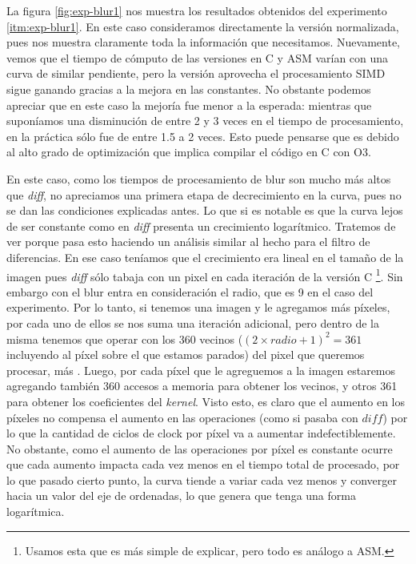 La figura \ref{fig:exp-blur1} nos muestra los resultados obtenidos del experimento \ref{itm:exp-blur1}. En este caso consideramos directamente la versión normalizada, pues nos muestra claramente toda la información que necesitamos. Nuevamente, vemos que el tiempo de cómputo de las versiones en C y ASM varían con una curva de similar pendiente, pero la versión aprovecha el procesamiento SIMD sigue ganando gracias a la mejora en las constantes. No obstante podemos apreciar que en este caso la mejoría fue menor a la esperada: mientras que suponíamos una disminución de entre 2 y 3 veces en el tiempo de procesamiento, en la práctica sólo fue de entre 1.5 a 2 veces. Esto puede pensarse que es debido al alto grado de optimización que implica compilar el código en C con O3.

En este caso, como los tiempos de procesamiento de blur son mucho más altos que \emph{diff}, no apreciamos una primera etapa de decrecimiento en la curva, pues no se dan las condiciones explicadas antes. Lo que si es notable es que la curva lejos de ser constante como en \emph{diff} presenta un crecimiento logarítmico. Tratemos de ver porque pasa esto haciendo un análisis similar al hecho para el filtro de diferencias. En ese caso teníamos que el crecimiento era lineal en el tamaño de la imagen pues \emph{diff} sólo tabaja con un pixel en cada iteración de la versión C \footnote{Usamos esta que es más simple de explicar, pero todo es análogo a ASM.}. Sin embargo con el blur entra en consideración el radio, que es 9 en el caso del experimento. Por lo tanto, si tenemos una imagen y le agregamos más píxeles, por cada uno de ellos se nos suma una iteración adicional, pero dentro de la misma tenemos que operar con los 360 vecinos ($(2\times radio + 1)^2= 361$ incluyendo al píxel sobre el que estamos parados) del pixel que queremos procesar, más . Luego, por cada píxel que le agreguemos a la imagen estaremos agregando también 360 accesos a memoria para obtener los vecinos, y otros 361 para obtener los coeficientes del \emph{kernel}. Visto esto, es claro que el aumento en los píxeles no compensa el aumento en las operaciones (como si pasaba con $diff$) por lo que la cantidad de ciclos de clock por píxel va a aumentar indefectiblemente. No obstante, como el aumento de las operaciones por píxel es constante ocurre que cada aumento impacta cada vez menos en el tiempo total de procesado, por lo que pasado cierto punto, la curva tiende a variar cada vez menos y converger hacia un valor del eje de ordenadas, lo que genera que tenga una forma logarítmica.


